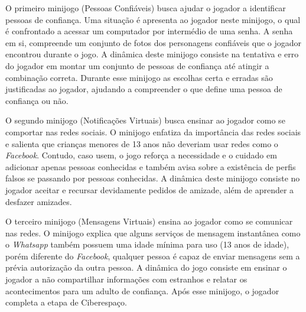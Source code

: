 O primeiro minijogo (Pessoas Confiáveis) busca ajudar o jogador a identificar pessoas de confiança. Uma situação é apresenta ao jogador neste minijogo, o qual é confrontado a acessar um computador por intermédio de uma senha. A senha em si, compreende um conjunto de fotos dos personagens confiáveis que o jogador encontrou durante o jogo. A dinâmica deste minijogo consiste na tentativa e erro do jogador em montar um conjunto de pessoas de confiança até atingir a combinação correta. Durante esse minijogo as escolhas certa e erradas são justificadas ao jogador, ajudando a compreender o que define uma pessoa de confiança ou não. 

O segundo minijogo (Notificações Virtuais) busca ensinar ao jogador como se comportar nas redes sociais. O minijogo enfatiza da importância das redes sociais e salienta que crianças menores de 13 anos não deveriam usar redes como o \textit{Facebook}. Contudo, caso usem, o jogo reforça a necessidade e o cuidado em adicionar apenas pessoas conhecidas e também avisa sobre a existência de perfis falsos se passando por pessoas conhecidas. A dinâmica deste minijogo consiste no jogador aceitar e recursar devidamente pedidos de amizade, além de aprender a desfazer amizades. %

O terceiro minijogo (Mensagens Virtuais) ensina ao jogador como se comunicar nas redes. O minijogo explica que alguns serviços de mensagem instantânea como o \textit{Whatsapp} também possuem uma idade mínima para uso (13 anos de idade), porém diferente do \textit{Facebook}, qualquer pessoa é capaz de enviar mensagens sem a prévia autorização da outra pessoa. A dinâmica do jogo consiste em ensinar o jogador a não compartilhar informações com estranhos e relatar os acontecimentos para um adulto de confiança. Após esse minijogo, o jogador completa a etapa de Ciberespaço. 



